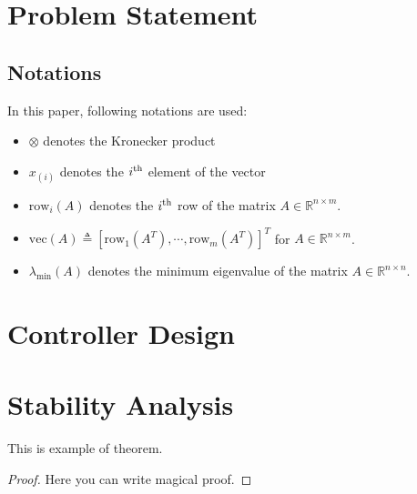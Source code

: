 \documentclass[conference]{IEEEtran}
\begin{document}
\color{blue}\lipsum[1-4]\color{black}

\section{Problem Statement}

\subsection{Notations}

In this paper, following notations are used:
\begin{itemize}
    \item $\otimes$ denotes the Kronecker product 
    \item $x_{(i)}$ denotes the $i\textsuperscript{th}$ element of the vector 
    \item $\text{row}_i(A)$ denotes the $i\textsuperscript{th}$ row of the matrix $A\in\mathbb{R}^{n\times m}$. 
    \item $\text{vec}(A)\triangleq [\text{row}_1(A^T)  ,\cdots,\text{row}_m(A^T)  ]^T   $ for $A\in\mathbb{R}^{n\times m}$.
    \item $\lambda_\text{min}(A)$ denotes the minimum eigenvalue of the matrix $A\in\mathbb{R}^{n\times n}$.
\end{itemize}

\section{Controller Design}

\color{blue}\lipsum[1-3]\color{black}

\section{Stability Analysis}    

\begin{theorem}
    This is example of theorem.
	\color{blue}\lipsum[1-2]\color{black}
\end{theorem}

\begin{proof}
	Here you can write magical proof.
	\color{blue}\lipsum[1-2]\color{black}
\end{proof}
\end{document}
